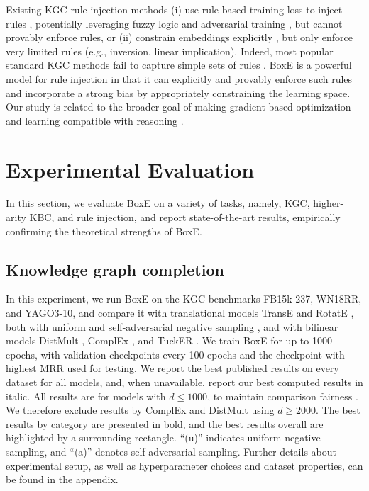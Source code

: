 \documentclass{article}
\begin{document}
Existing KGC rule injection methods (i) use rule-based training loss to inject rules \cite{demeester16,rocktaschel15}, potentially leveraging fuzzy logic \cite{guo16} and adversarial training \cite{minervini17}, but cannot provably enforce rules, or (ii) constrain embeddings explicitly \cite{ding18,rocktaschel15}, but only enforce very limited rules (e.g., inversion, linear implication). Indeed, most popular standard KGC methods fail to capture simple sets of rules \cite{Gutirrez18}. 
BoxE is a powerful model for rule injection in that it can explicitly and provably enforce such rules and incorporate a strong bias by appropriately constraining the learning space. Our study is related to the broader goal of making gradient-based optimization and learning compatible with reasoning \cite{LeCunTalk}. 

\section{Experimental Evaluation}
In this section, we evaluate BoxE on a variety of tasks, namely, KGC, higher-arity KBC, and rule injection, and report state-of-the-art results, empirically confirming the theoretical strengths of BoxE. 


\subsection{Knowledge graph completion}
\label{ssec:KGCRes}
In this experiment, we run BoxE on the KGC benchmarks FB15k-237, WN18RR, and YAGO3-10, and compare it with translational models TransE \cite{TransE-NIPS13} and RotatE \cite{RotatE-ICLR19}, both with uniform and self-adversarial negative sampling \cite{RotatE-ICLR19}, and with bilinear models DistMult \cite{DistMult-ICLR15}, ComplEx \cite{ComplEx-ICML16}, and TuckER \cite{TuckER}.
We train BoxE for up to 1000 epochs, with validation checkpoints every 100 epochs and the checkpoint with highest MRR used for testing. We report the best published results on every dataset for all models, and, when unavailable, report our best computed results in italic. All results are for models with $d \leq 1000$, to maintain comparison fairness  \cite{TuckER}. We therefore exclude results by ComplEx \cite{N3Reg-ICML18} and DistMult \cite{ruffinelli2020you} using $d\geq2000$. The best results by category are presented in bold, and the best results overall are highlighted by a surrounding rectangle. ``(u)'' indicates uniform negative sampling, and ``(a)'' denotes self-adversarial sampling. Further details about experimental setup, as well as hyperparameter choices and dataset properties, can be found in the appendix.
\end{document}
